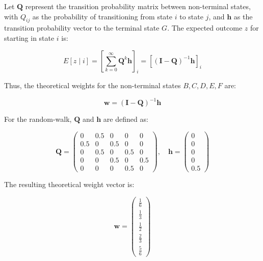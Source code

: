 \documentclass[lettersize,journal]{IEEEtran}
\begin{document}
Let \(\mathbf{Q}\) represent the transition probability matrix between non-terminal states, with \(Q_{ij}\) as the probability of transitioning from state \(i\) to state \(j\), and \(\mathbf{h}\) as the transition probability vector to the terminal state \(G\). The expected outcome \(z\) for starting in state \(i\) is:

\[
E[z \mid i] = \left[ \sum_{k=0}^{\infty} \mathbf{Q}^k \mathbf{h} \right]_i = \left[ (\mathbf{I} - \mathbf{Q})^{-1} \mathbf{h} \right]_i
\]

Thus, the theoretical weights for the non-terminal states \(B, C, D, E, F\) are:

\[
\mathbf{w} = (\mathbf{I} - \mathbf{Q})^{-1} \mathbf{h}
\]

For the random-walk, \(\mathbf{Q}\) and \(\mathbf{h}\) are defined as:

\[
\mathbf{Q} = \begin{pmatrix}
0 & 0.5 & 0 & 0 & 0 \\
0.5 & 0 & 0.5 & 0 & 0 \\
0 & 0.5 & 0 & 0.5 & 0 \\
0 & 0 & 0.5 & 0 & 0.5 \\
0 & 0 & 0 & 0.5 & 0
\end{pmatrix}, \quad
\mathbf{h} = \begin{pmatrix}
0 \\
0 \\
0 \\
0 \\
0.5
\end{pmatrix}
\]

The resulting theoretical weight vector is:

\[
\mathbf{w} = \begin{pmatrix}
\frac{1}{6} \\
\frac{1}{3} \\
\frac{1}{2} \\
\frac{2}{3} \\
\frac{5}{6}
\end{pmatrix}
\]
\end{document}

